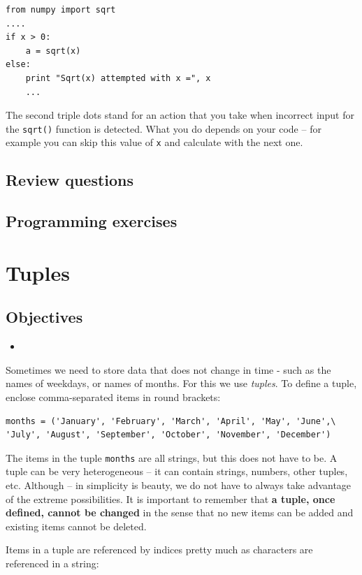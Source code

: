 \begin{verbatim}
from numpy import sqrt
....
if x > 0:
    a = sqrt(x)
else:
    print "Sqrt(x) attempted with x =", x
    ...
\end{verbatim}
The second triple dots stand for an action that you take when incorrect 
input for the {\tt sqrt()} function is detected. What you do depends on 
your code -- for example you can skip this value of {\tt x} and calculate 
with the next one. 

\subsection{Review questions}

\subsection{Programming exercises}


\section{Tuples}

\subsection{Objectives}

\begin{itemize}
\item
\end{itemize}
Sometimes we need to store data that does not change in time - such as 
the names of weekdays, or names of months. For this we use {\em tuples}.
To define a tuple, enclose comma-separated items in round brackets: 

\begin{verbatim}
months = ('January', 'February', 'March', 'April', 'May', 'June',\
'July', 'August', 'September', 'October', 'November', 'December')
\end{verbatim}
The items in the tuple {\tt months} are all strings, but this does not 
have to be. A tuple can be very heterogeneous -- it can contain strings,
numbers, other tuples, etc. Although -- in simplicity is beauty, we
do not have to always take advantage of the extreme possibilities.
It is important to remember that {\bf a tuple, once defined, cannot 
be changed} in the sense that no new items can be added and existing 
items cannot be deleted.

Items in a tuple are referenced by indices pretty much as characters 
are referenced in a string:

